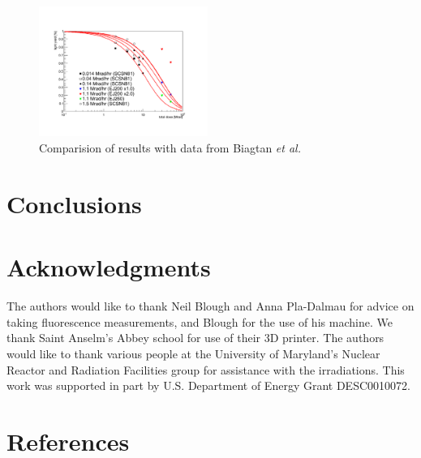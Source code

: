 \documentclass[review]{elsarticle}
\begin{document}
\begin{figure}[!ht]
\begin{center}
\includegraphics[width=0.49\textwidth]{./figures/Biagtan.pdf}
\caption{
Comparision of results with data from Biagtan {\it et al.}~\cite{Biagtan1996125}
}
\label{fig:ej200doping1x}
\end{center}
\end{figure}



\section{Conclusions}

\section{Acknowledgments}
The authors would like to thank Neil Blough and Anna Pla-Dalmau for advice on taking fluorescence measurements, and Blough for the use of his machine. We thank Saint Anselm's Abbey school for use of their 3D printer.   
The authors would like to thank {\color{red} various people} at
the University of Maryland's Nuclear Reactor and Radiation
Facilities group for assistance
with the irradiations.
This work was supported in part by U.S. Department of Energy Grant DESC0010072.

\section*{References}


\end{document}
